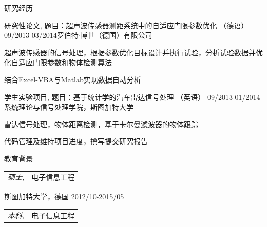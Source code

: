 \documentclass{resume} %
\begin{document}
\begin{CJK*}{UTF8}{gbsn}
\begin{rSection}{研究经历}

\begin{rSubsection}{研究性论文, 题目：超声波传感器测距系统中的自适应门限参数优化 （德语）}{09/2013-03/2014}{罗伯特$\cdot$博世（德国）有限公司}{}
\item 超声波传感器的信号处理，根据参数优化目标设计并执行试验，分析试验数据并优化自适应门限参数和物体检测算法
\item 结合Excel-VBA与Matlab实现数据自动分析
\end{rSubsection}


\begin{rSubsection}{学生实验项目, 题目：基于统计学的汽车雷达信号处理 （英语）
}{09/2013-01/2014}{系统理论与信号处理学院，斯图加特大学}{}

\item 雷达信号处理，物体距离检测，基于卡尔曼滤波器的物体跟踪
\item 代码管理及维持项目进度，撰写提交研究报告

\end{rSubsection}

% 
% 
\end{rSection}


\begin{rSection}{教育背景}
\begin{tabular}{l l}
 
{\sl 硕士,} & 电子信息工程\\
\end{tabular}

斯图加特大学，德国 \hfill 2012/10-2015/05 \\

\begin{tabular}{l l}
{\sl 本科,} & 电子信息工程\\
\end{tabular}


\end{rSection}
\end{CJK*}
\end{document}
